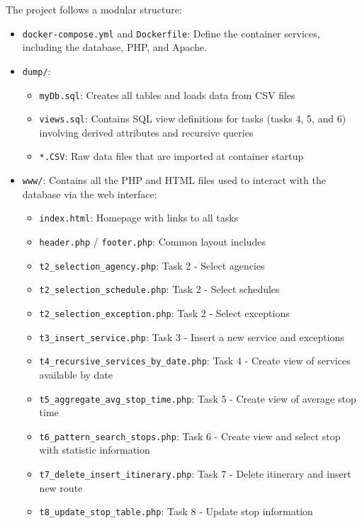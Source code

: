 \documentclass[a4paper, 12pt]{article}
\begin{document}
The project follows a modular structure:
\begin{itemize}
    \item \texttt{docker-compose.yml} and \texttt{Dockerfile}: Define the container services, including the database, PHP, and Apache.
    \item \texttt{dump/}:
    \begin{itemize}
        \item \texttt{myDb.sql}: Creates all tables and loads data from CSV files
        \item \texttt{views.sql}: Contains SQL view definitions for tasks (tasks 4, 5, and 6) involving derived attributes and recursive queries
        \item \texttt{*.CSV}: Raw data files that are imported at container startup
    \end{itemize}
    \item \texttt{www/}: Contains all the PHP and HTML files used to interact with the database via the web interface:
    \begin{itemize}
        \item \texttt{index.html}: Homepage with links to all tasks
        \item \texttt{header.php} / \texttt{footer.php}: Common layout includes
        \item \texttt{t2\_selection\_agency.php}: Task 2 - Select agencies
        \item \texttt{t2\_selection\_schedule.php}: Task 2 - Select schedules
        \item \texttt{t2\_selection\_exception.php}: Task 2 - Select exceptions
        \item \texttt{t3\_insert\_service.php}: Task 3 - Insert a new service and exceptions
        \item \texttt{t4\_recursive\_services\_by\_date.php}: Task 4 - Create view of services available by date
        \item \texttt{t5\_aggregate\_avg\_stop\_time.php}: Task 5 - Create view of average stop time
        \item \texttt{t6\_pattern\_search\_stops.php}: Task 6 - Create view and select stop with statistic information
        \item \texttt{t7\_delete\_insert\_itinerary.php}: Task 7 - Delete itinerary and insert new route
        \item \texttt{t8\_update\_stop\_table.php}: Task 8 - Update stop information
    \end{itemize}
\end{itemize}
\end{document}
